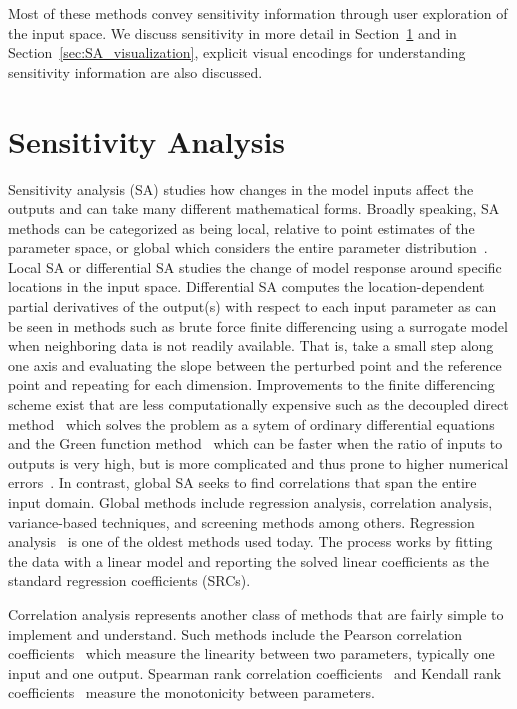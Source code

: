 Most of these methods convey sensitivity information through user exploration of the input space.
%
We discuss sensitivity in more detail in Section~\ref{sec:sensitivity} and in Section~\ref{sec:SA_visualization}, explicit visual encodings for understanding sensitivity information are also discussed.

\section{Sensitivity Analysis}
\label{sec:sensitivity}
Sensitivity analysis (SA) studies how changes in the model inputs affect the outputs and can take many different mathematical forms.
%
Broadly speaking, SA methods can be categorized as being local, relative to point estimates of the parameter space, or global which considers the entire parameter distribution~\cite{Hamby1995}.
%
Local SA or differential SA studies the change of model response around specific locations in the input space.
%
Differential SA computes the location-dependent partial derivatives of the output(s) with respect to each input parameter as can be seen in methods such as brute force finite differencing using a surrogate model when neighboring data is not readily available.
%
That is, take a small step along one axis and evaluating the slope between the perturbed point and the reference point and repeating for each dimension.
%
Improvements to the finite differencing scheme exist that are less computationally expensive such as the decoupled direct method~\cite{Dunker1981,Dunker1984} which solves the problem as a sytem of ordinary differential equations and the Green function method~\cite{KramerCaloRabitz1981} which can be faster when the ratio of inputs to outputs is very high, but is more complicated and thus prone to higher numerical errors~\cite{SaltelliChanScott2000}.
%
In contrast, global SA seeks to find correlations that span the entire input domain.
%
Global methods include regression analysis, correlation analysis, variance-based techniques, and screening methods among others.
%
Regression analysis~\cite{Galton1886} is one of the oldest methods used today.
%
The process works by fitting the data with a linear model and reporting the solved linear coefficients as the standard regression coefficients (SRCs).

Correlation analysis represents another class of methods that are fairly simple to implement and understand.
%
Such methods include the Pearson correlation coefficients~\cite{Pearson1895} which measure the linearity between two parameters, typically one input and one output.
%
Spearman rank correlation coefficients~\cite{Spearman1904} and Kendall rank coefficients~\cite{KendallGibbons1990} measure the monotonicity between parameters.

